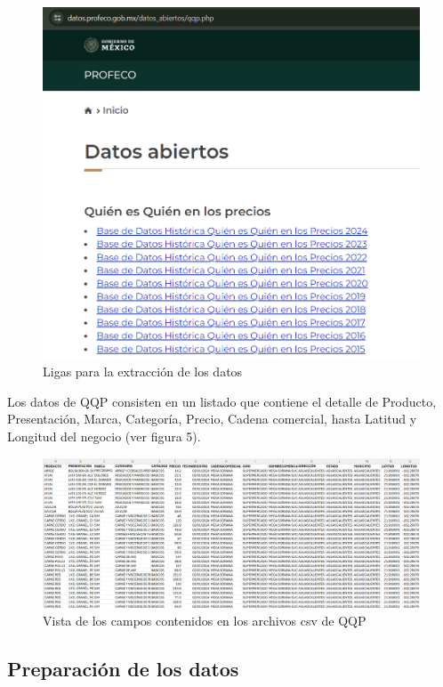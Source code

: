 \documentclass{article}
\begin{document}
\begin{figure}[h]
\centering
\includegraphics[width=1\linewidth]{Reports/images/datos.png}
\caption{\label{fig:datos} Ligas para la extracción de los datos}
\end{figure}

\newpage
Los datos de QQP consisten en un listado que contiene el detalle de Producto, Presentación, Marca, Categoría, Precio, Cadena comercial, hasta Latitud y Longitud del negocio (ver figura 5).

\begin{figure}[h]
\centering
\includegraphics[width=1\linewidth]{Reports/images/sample.png}
\caption{\label{fig:sample} Vista de los campos contenidos en los archivos csv de QQP}
\end{figure}
\subsection{Preparación de los datos}
\end{document}
